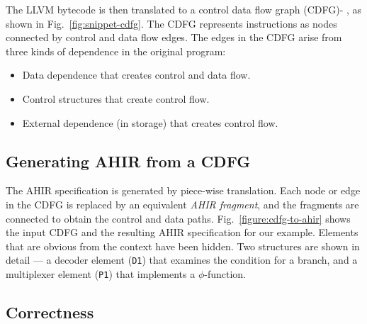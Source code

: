 \documentclass[conference]{IEEEtran}
\begin{document}
The LLVM bytecode is then translated to a control data flow graph
(CDFG)\cite{conditional_branches_rim_jain_1992}-%
\cite{functional_synthesis_TASS_amellal_kaminska_1994}, as shown in
Fig.~\ref{fig:snippet-cdfg}. The CDFG represents instructions as
nodes connected by control and data flow edges. The edges in the CDFG
arise from three kinds of dependence in the original program:

\begin{itemize}
\item Data dependence that creates control and data flow.
\item Control structures that create control flow.
\item External dependence (in storage) that creates control flow.
\end{itemize}

\subsection{Generating AHIR from a CDFG}

\begin{figure*}
\centering
{}%
\hspace{0.25in}%
%
\hspace{0.25in}%
%
\caption{Translating a CDFG to AHIR.}%
\label{figure:cdfg-to-ahir}%
\end{figure*}

The AHIR specification is generated by piece-wise translation. Each
node or edge in the CDFG is replaced by an equivalent \emph{AHIR
  fragment}, and the fragments are connected to obtain the control and
data paths. Fig.~\ref{figure:cdfg-to-ahir} shows the input CDFG and
the resulting AHIR specification for our example. Elements that are
obvious from the context have been hidden. Two structures are shown in
detail --- a decoder element (\texttt{D1}) that examines the condition
for a branch, and a multiplexer element (\texttt{P1}) that implements
a $\phi$-function.

\subsection{Correctness}
\end{document}
